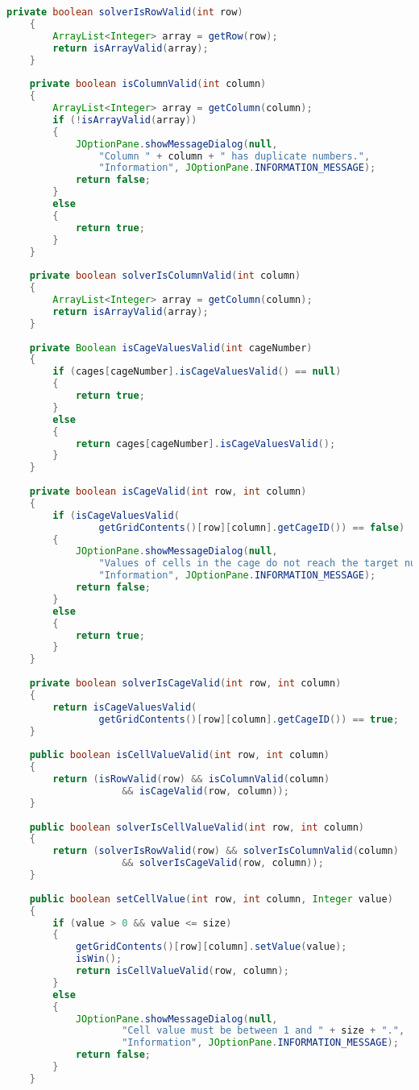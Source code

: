 \begin{lstlisting}[language=Java,basicstyle=\tiny,caption=Grid.java]
    private boolean solverIsRowValid(int row)
    {
        ArrayList<Integer> array = getRow(row);
        return isArrayValid(array);
    }
    
    private boolean isColumnValid(int column)
    {
        ArrayList<Integer> array = getColumn(column);
        if (!isArrayValid(array))
        {
            JOptionPane.showMessageDialog(null, 
                "Column " + column + " has duplicate numbers.",
                "Information", JOptionPane.INFORMATION_MESSAGE);
            return false;
        }
        else
        {
            return true;
        }
    }
    
    private boolean solverIsColumnValid(int column)
    {
        ArrayList<Integer> array = getColumn(column);
        return isArrayValid(array);
    }
    
    private Boolean isCageValuesValid(int cageNumber)
    {
        if (cages[cageNumber].isCageValuesValid() == null)
        {
            return true;
        }
        else
        {
            return cages[cageNumber].isCageValuesValid();
        }
    }
    
    private boolean isCageValid(int row, int column)
    {
        if (isCageValuesValid(
                getGridContents()[row][column].getCageID()) == false)
        {
            JOptionPane.showMessageDialog(null, 
                "Values of cells in the cage do not reach the target number.",
                "Information", JOptionPane.INFORMATION_MESSAGE);
            return false;
        }
        else
        {
            return true;
        }
    }
    
    private boolean solverIsCageValid(int row, int column)
    {
        return isCageValuesValid(
                getGridContents()[row][column].getCageID()) == true;
    }
    
    public boolean isCellValueValid(int row, int column)
    {
        return (isRowValid(row) && isColumnValid(column) 
                    && isCageValid(row, column));
    }
    
    public boolean solverIsCellValueValid(int row, int column)
    {
        return (solverIsRowValid(row) && solverIsColumnValid(column) 
                    && solverIsCageValid(row, column));
    }
    
    public boolean setCellValue(int row, int column, Integer value)
    {
        if (value > 0 && value <= size)
        {
            getGridContents()[row][column].setValue(value);
            isWin();
            return isCellValueValid(row, column);
        }
        else
        {
            JOptionPane.showMessageDialog(null, 
                    "Cell value must be between 1 and " + size + ".",
                    "Information", JOptionPane.INFORMATION_MESSAGE);
            return false;
        }   
    }
    

\end{lstlisting}
